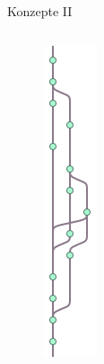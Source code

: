 \begin{frame}{Konzepte II}
	\begin{columns}
			\begin{figure}
				\includegraphics[width=\linewidth]{images/branchmerge.png}
			\end{figure}


\end{columns}
\end{frame}

